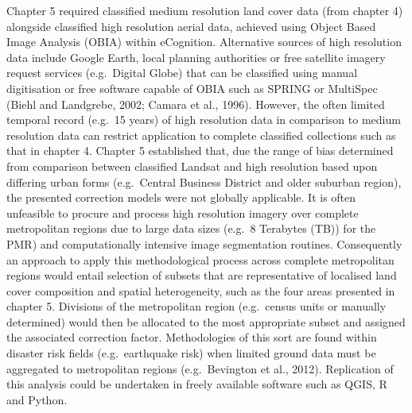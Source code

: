 \documentclass[]{book}
\begin{document}
Chapter 5 required classified medium resolution land cover data (from
chapter 4) alongside classified high resolution aerial data, achieved
using Object Based Image Analysis (OBIA) within eCognition. Alternative
sources of high resolution data include Google Earth, local planning
authorities or free satellite imagery request services (e.g.~Digital
Globe) that can be classified using manual digitisation or free software
capable of OBIA such as SPRING or MultiSpec (Biehl and Landgrebe, 2002;
Camara et al., 1996). However, the often limited temporal record
(e.g.~15 years) of high resolution data in comparison to medium
resolution data can restrict application to complete classified
collections such as that in chapter 4. Chapter 5 established that, due
the range of bias determined from comparison between classified Landsat
and high resolution based upon differing urban forms (e.g.~Central
Business District and older suburban region), the presented correction
models were not globally applicable. It is often unfeasible to procure
and process high resolution imagery over complete metropolitan regions
due to large data sizes (e.g.~8 Terabytes (TB)) for the PMR) and
computationally intensive image segmentation routines. Consequently an
approach to apply this methodological process across complete
metropolitan regions would entail selection of subsets that are
representative of localised land cover composition and spatial
heterogeneity, such as the four areas presented in chapter 5. Divisions
of the metropolitan region (e.g.~census units or manually determined)
would then be allocated to the most appropriate subset and assigned the
associated correction factor. Methodologies of this sort are found
within disaster risk fields (e.g.~earthquake risk) when limited ground
data must be aggregated to metropolitan regions (e.g.~Bevington et al.,
2012). Replication of this analysis could be undertaken in freely
available software such as QGIS, R and Python.
\end{document}

